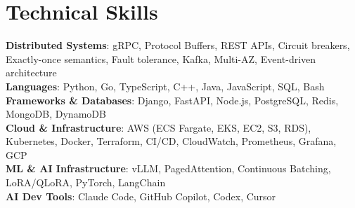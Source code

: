 \documentclass[letterpaper,11pt]{article}
\begin{document}
\section{Technical Skills}
\vspace{-7pt}
\begin{itemize}
[leftmargin=0.15in, label={}]\small{\item{
        \textbf{Distributed Systems}{: gRPC, Protocol Buffers, REST APIs, Circuit breakers, Exactly-once semantics, Fault tolerance, Kafka, Multi-AZ, Event-driven architecture} \\
        \textbf{Languages}{: Python, Go, TypeScript, C++, Java, JavaScript, SQL, Bash} \\
        \textbf{Frameworks \& Databases}{: Django, FastAPI, Node.js, PostgreSQL, Redis, MongoDB, DynamoDB} \\
        \textbf{Cloud \& Infrastructure}{: AWS (ECS Fargate, EKS, EC2, S3, RDS), Kubernetes, Docker, Terraform, CI/CD, CloudWatch, Prometheus, Grafana, GCP} \\
        \textbf{ML \& AI Infrastructure}{: vLLM, PagedAttention, Continuous Batching, LoRA/QLoRA, PyTorch, LangChain} \\
        \textbf{AI Dev Tools}{: Claude Code, GitHub Copilot, Codex, Cursor} \\
}}
\end{itemize}
\end{document}
